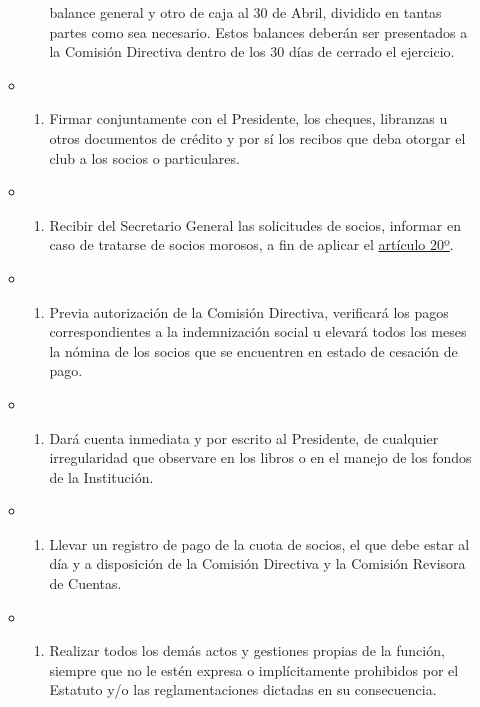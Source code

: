 \documentclass[]{book}
\providecommand{\tightlist}{%
  \setlength{\itemsep}{0pt}\setlength{\parskip}{0pt}}
\begin{document}
\begin{itemize}
\begin{itemize}
\begin{enumerate}
      balance general y otro de caja al 30 de Abril, dividido en tantas
      partes como sea necesario. Estos balances deberán ser presentados
      a la Comisión Directiva dentro de los 30 días de cerrado el
      ejercicio.
    \end{enumerate}
  \item
    \begin{enumerate}
    \def\labelenumi{\alph{enumi})}
    \setcounter{enumi}{5}
    \tightlist
    \item
      Firmar conjuntamente con el Presidente, los cheques, libranzas u
      otros documentos de crédito y por sí los recibos que deba otorgar
      el club a los socios o particulares.
    \end{enumerate}
  \item
    \begin{enumerate}
    \def\labelenumi{\alph{enumi})}
    \setcounter{enumi}{6}
    \tightlist
    \item
      Recibir del Secretario General las solicitudes de socios, informar
      en caso de tratarse de socios morosos, a fin de aplicar el
      \protect\hyperlink{art20}{artículo 20º}.
    \end{enumerate}
  \item
    \begin{enumerate}
    \def\labelenumi{\alph{enumi})}
    \setcounter{enumi}{7}
    \tightlist
    \item
      Previa autorización de la Comisión Directiva, verificará los pagos
      correspondientes a la indemnización social u elevará todos los
      meses la nómina de los socios que se encuentren en estado de
      cesación de pago.
    \end{enumerate}
  \item
    \begin{enumerate}
    \def\labelenumi{\roman{enumi})}
    \tightlist
    \item
      Dará cuenta inmediata y por escrito al Presidente, de cualquier
      irregularidad que observare en los libros o en el manejo de los
      fondos de la Institución.
    \end{enumerate}
  \item
    \begin{enumerate}
    \def\labelenumi{\alph{enumi})}
    \setcounter{enumi}{9}
    \tightlist
    \item
      Llevar un registro de pago de la cuota de socios, el que debe
      estar al día y a disposición de la Comisión Directiva y la
      Comisión Revisora de Cuentas.
    \end{enumerate}
  \item
    \begin{enumerate}
    \def\labelenumi{\alph{enumi})}
    \setcounter{enumi}{10}
    \tightlist
    \item
      Realizar todos los demás actos y gestiones propias de la función,
      siempre que no le estén expresa o implícitamente prohibidos por el
      Estatuto y/o las reglamentaciones dictadas en su consecuencia.
    \end{enumerate}
  \end{itemize}
\end{itemize}
\end{document}
